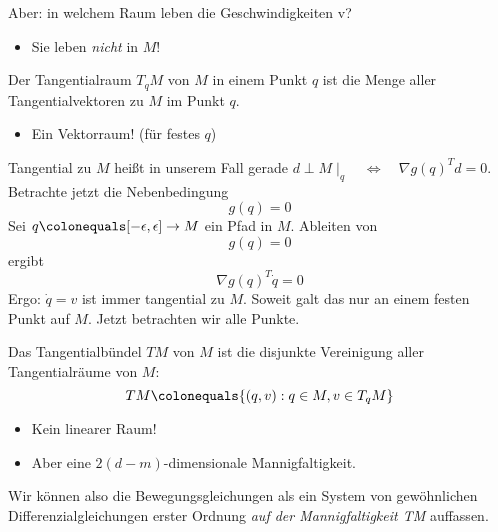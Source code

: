 Aber: in welchem Raum leben die Geschwindigkeiten v?
\begin{itemize}
\item Sie leben \emph{nicht} in $M$!
\end{itemize}

\begin{definition}
Der Tangentialraum $T_q M$ von $M$ in einem Punkt $q$ ist die Menge aller Tangentialvektoren zu $M$ im Punkt $q$.
\begin{itemize}
\item Ein Vektorraum! (für festes $q$)
\end{itemize}
\end{definition}

Tangential zu $M$ heißt in unserem Fall gerade $d \perp M \mid_q \quad \Leftrightarrow \quad \nabla g(q)^T d = 0$.
Betrachte jetzt die Nebenbedingung
\begin{equation*}
g(q) = 0
\end{equation*}
Sei $q \colonequals [-\epsilon, \epsilon] \rightarrow M$ ein Pfad in $M$. Ableiten von
\begin{equation*}
g(q) = 0
\end{equation*}
ergibt
\begin{equation*}
\nabla g(q)^T \dot{q} = 0
\end{equation*}
Ergo: $\dot{q} = v$ ist immer tangential zu $M$. Soweit galt das nur an einem festen Punkt auf $M$. Jetzt betrachten wir alle Punkte.

\begin{definition}
Das Tangentialbündel $TM$ von $M$ ist die disjunkte Vereinigung aller Tangentialräume von $M$:
\begin{equation*}
TM \colonequals \{ (q,v) : q \in M, v \in T_q M\}
\end{equation*}
\end{definition}

\begin{itemize} 
\item Kein linearer Raum!
\item Aber eine $2(d-m)$-dimensionale Mannigfaltigkeit.
\end{itemize}

Wir können also die Bewegungsgleichungen als ein System von gewöhnlichen Differenzialgleichungen erster Ordnung \emph{auf der Mannigfaltigkeit TM} auffassen.

